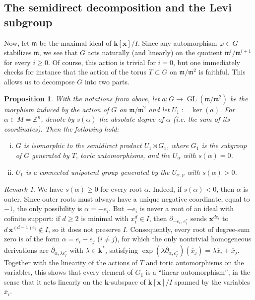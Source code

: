 \documentclass[11pt,letterpaper,reqno]{amsart}
\newtheorem{proposition}[proposition]{Proposition}
\theoremstyle{remark}
\newtheorem{remark}[remark]{Remark}
\theoremstyle{definition}
\def\M{\mathfrak{m}}
\def\XX{\mathbf{x}}
\newcommand{\KK}[0]{\ensuremath{\mathbf{k}}}
\newcommand{\ZZ}[0]{\ensuremath{\mathbb{Z}}}
\newcommand{\GL}[0]{\ensuremath{\operatorname{GL}}}
\begin{document}
\subsection{The semidirect decomposition and the Levi subgroup}

Now, let $\M$ be the maximal ideal of $\KK[\XX]/I$. Since any automorphism $\varphi\in G$ stabilizes $\M$, we see that $G$ acts naturally (and linearly) on the quotient $\M^i/\M^{i+1}$ for every $i\geq 0$. Of course, this action is trivial for $i=0$, but one immediately checks for instance that the action of the torus $T\subset G$ on $\M/\M^2$ is faithful. This allows us to decompose $G$ into two parts.

\begin{proposition}\label{prop:semidirect}
With the notations from above, let $a:G\to\GL(\M/\M^2)$ be the morphism induced by the action of $G$ on $\M/\M^2$ and let $U_1:=\ker(a)$. For $\alpha\in M=\ZZ^n$, denote by $s(\alpha)$ the absolute degree of $\alpha$ (i.e. the sum of its coordinates). Then the following hold:
\begin{enumerate}[(i)]
    \item $G$ is isomorphic to the semidirect product $U_1\rtimes G_1$, where $G_1$ is the subgroup of $G$ generated by $T$, toric automorphisms, and the $U_{\alpha}$ with $s(\alpha)=0$.\label{item:semidirect}
    \item $U_1$ is a connected unipotent group generated by the $U_{\alpha,p}$ with $s(\alpha)>0$.\label{item:unipotent}
\end{enumerate}
\end{proposition}

\begin{remark}\label{remark:-e_i}
We have $s(\alpha)\geq 0$ for every root $\alpha$. Indeed, if $s(\alpha)<0$, then $\alpha$ is outer. Since outer roots must always have a unique negative coordinate, equal to $-1$, the only possibility is $\alpha=-e_i$. But $-e_i$ is never a root of an ideal with cofinite support: if $d\geq2$ is minimal with $x_i^d\in I$, then $\partial_{-e_i,\,e_i^*}$ sends $\XX^{d e_i}$ to $d\,\XX^{(d-1)e_i}\notin I$, so it does not preserve $I$. Consequently, every root of degree-sum zero is of the form $\alpha=e_{i}-e_{j}$ ($i\neq j$), for which the only nontrivial homogeneous derivations are $\overline\partial_{\alpha,\lambda e_j^*}$ with $\lambda\in\KK^*$, satisfying $\exp(\lambda \overline\partial_{\alpha,e_j^*})(\overline x_j)=\lambda \overline x_i+\overline x_j.$ Together with the linearity of the actions of $T$ and toric automorphisms on the variables, this shows that every element of $G_1$ is a ``linear automorphism'', in the sense that it acts linearly on the $\KK$-subspace of $\KK[\XX]/I$ spanned by the variables $\overline{x}_{i}$.
\end{remark}
\end{document}
